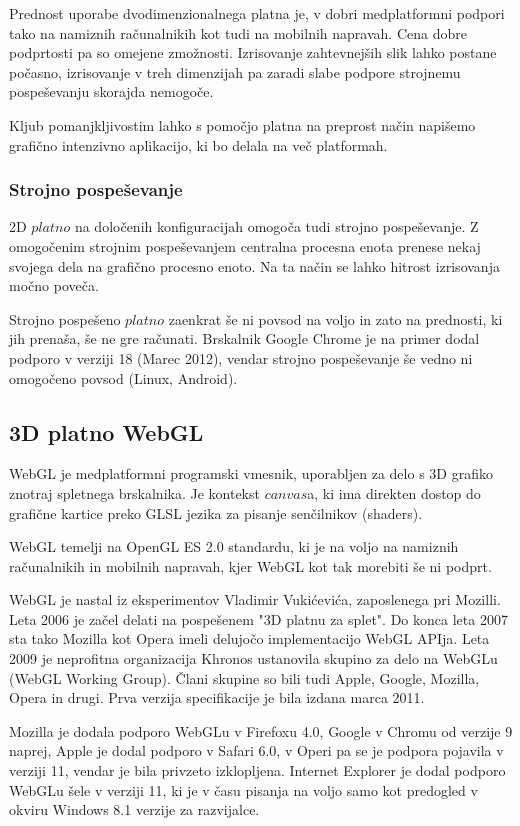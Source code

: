 Prednost uporabe dvodimenzionalnega platna je, v dobri medplatformni podpori tako na namiznih računalnikih kot tudi na mobilnih napravah. Cena dobre podprtosti pa so omejene zmožnosti. Izrisovanje zahtevnejših slik lahko postane počasno, izrisovanje v treh dimenzijah pa zaradi slabe podpore strojnemu pospeševanju skorajda nemogoče. 

Kljub pomanjkljivostim lahko s pomočjo platna na preprost način napišemo grafično intenzivno aplikacijo, ki bo delala na več platformah. 

\subsubsection{Strojno pospeševanje}

2D $platno$ na določenih konfiguracijah omogoča tudi strojno pospeševanje. Z omogočenim strojnim pospeševanjem centralna procesna enota prenese nekaj svojega dela na grafično procesno enoto. Na ta način se lahko hitrost izrisovanja močno poveča.

Strojno pospešeno $platno$ zaenkrat še ni povsod na voljo in zato na prednosti, ki jih prenaša, še ne gre računati. Brskalnik Google Chrome je na primer dodal podporo v verziji 18 (Marec 2012), vendar strojno pospeševanje še vedno ni omogočeno povsod (Linux, Android).

\subsection{3D platno WebGL}
\label{sec:WebGL}
WebGL je medplatformni programski vmesnik, uporabljen za delo s 3D grafiko znotraj spletnega brskalnika. Je kontekst $canvas$a, ki ima direkten dostop do grafične kartice preko GLSL jezika za pisanje senčilnikov (shaders). 

WebGL temelji na OpenGL ES 2.0 standardu, ki je na voljo na namiznih računalnikih in mobilnih napravah, kjer WebGL kot tak morebiti še ni podprt.

WebGL je nastal iz eksperimentov Vladimir Vukićevića, zaposlenega pri Mozilli. Leta 2006 je začel delati na pospešenem "3D platnu za splet". Do konca leta 2007 sta tako Mozilla kot Opera imeli delujočo implementacijo WebGL APIja. Leta 2009 je neprofitna organizacija Khronos ustanovila skupino za delo na WebGLu (WebGL Working Group). Člani skupine so bili tudi Apple, Google, Mozilla, Opera in drugi. Prva verzija specifikacije je bila izdana marca 2011.

Mozilla je dodala podporo WebGLu v Firefoxu 4.0, Google v Chromu od verzije 9 naprej, Apple je dodal podporo v Safari 6.0, v Operi pa se je podpora pojavila v verziji 11, vendar je bila privzeto izklopljena. Internet Explorer je dodal podporo WebGLu šele v verziji 11, ki je v času pisanja na voljo samo kot predogled v okviru Windows 8.1 verzije za razvijalce.


